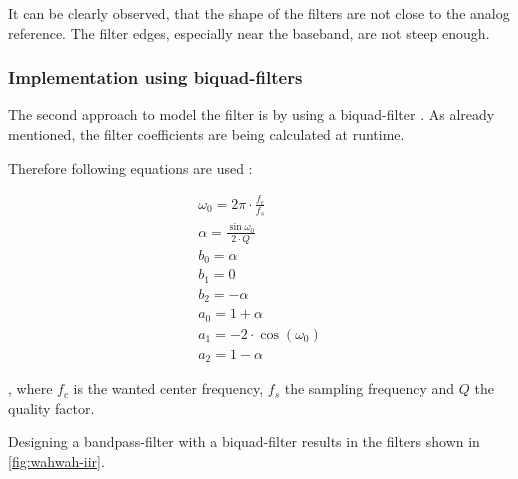 It can be clearly observed, that the shape of the filters are not close to the analog reference.
The filter edges, especially near the baseband, are not steep enough.

\subsubsection{Implementation using biquad-filters}

The second approach to model the filter is by using a biquad-filter \cite{arm_dsp}.
As already mentioned, the filter coefficients are being calculated at runtime.

Therefore following equations are used \cite{cookbook_audio}:

\begin{align}
    \omega_0 = 2 \pi \cdot \frac{f_c}{f_s}\\
    \alpha = \frac{\sin{\omega_0}}{2 \cdot Q}\\
    b_0 = \alpha\\
    b_1 = 0\\
    b_2 = -\alpha\\
    a_0 = 1 + \alpha\\
    a_1 = -2 \cdot \cos(\omega_0)\\
    a_2 = 1 - \alpha
\end{align}

, where $f_c$ is the wanted center frequency, $f_s$ the sampling frequency and $Q$ the quality factor.

Designing a bandpass-filter with a biquad-filter results in the filters shown in \autoref{fig:wahwah-iir}.

